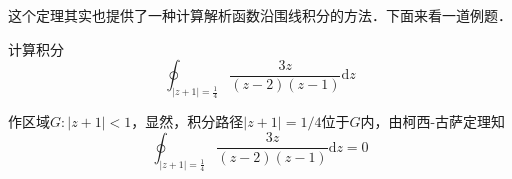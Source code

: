 这个定理其实也提供了一种计算解析函数沿围线积分的方法．下面来看一道例题．
\begin{example}{}
计算积分
\begin{equation}
\oint_{|z+1|=\frac{1}{4}} \frac{3 z}{(z-2)(z-1)} \mathrm{d} z
\end{equation}

作区域$G:|z+1|<1$，显然，积分路径$|z+1|=1/4$位于$G$内，由柯西-古萨定理知
\begin{equation}
\oint_{|z+1|=\frac{1}{4}} \frac{3 z}{(z-2)(z-1)} \mathrm{d} z=0
\end{equation}
\end{example}